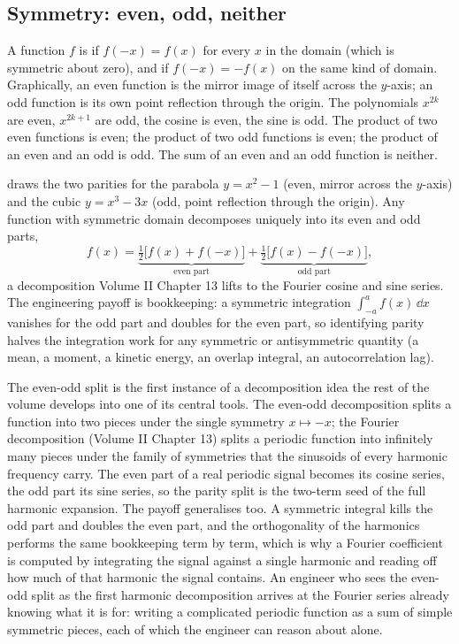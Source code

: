 \subsection{Symmetry: even, odd, neither}

A function $f$ is  if $f(-x) = f(x)$ for every $x$ in
the domain (which is symmetric about zero), and  if
$f(-x) = -f(x)$ on the same kind of domain. Graphically, an even
function is the mirror image of itself across the $y$-axis; an odd
function is its own point reflection through the origin. The
polynomials $x^{2k}$ are even, $x^{2k+1}$ are odd, the cosine is
even, the sine is odd. The product of two even functions is even;
the product of two odd functions is even; the product of an even
and an odd is odd. The sum of an even and an odd function is
neither.



 draws the two parities for
the parabola $y = x^{2} - 1$ (even, mirror across the $y$-axis) and
the cubic $y = x^{3} - 3x$ (odd, point reflection through the
origin). Any function with symmetric domain decomposes uniquely
into its even and odd parts,
\[
  f(x) = \underbrace{\tfrac{1}{2}\bigl[f(x) + f(-x)\bigr]}_{
    \text{even part}}
    + \underbrace{\tfrac{1}{2}\bigl[f(x) - f(-x)\bigr]}_{
    \text{odd part}},
\]
a decomposition Volume II Chapter 13 lifts to the Fourier cosine
and sine series. The engineering payoff is bookkeeping: a symmetric
integration $\int_{-a}^{a} f(x)\,\dd x$ vanishes for the odd part
and doubles for the even part, so identifying parity halves the
integration work for any symmetric or antisymmetric quantity (a
mean, a moment, a kinetic energy, an overlap integral, an
autocorrelation lag).

\begin{mastery}
The even-odd split is the first instance of a decomposition idea the
rest of the volume develops into one of its central tools. The
even-odd decomposition splits a function into two pieces under the
single symmetry $x \mapsto -x$; the Fourier decomposition (Volume II
Chapter 13) splits a periodic function into infinitely many pieces
under the family of symmetries that the sinusoids of every harmonic
frequency carry. The even part of a real periodic signal becomes its
cosine series, the odd part its sine series, so the parity split is
the two-term seed of the full harmonic expansion. The payoff
generalises too. A symmetric integral kills the odd part and doubles
the even part, and the orthogonality of the harmonics performs the
same bookkeeping term by term, which is why a Fourier coefficient is
computed by integrating the signal against a single harmonic and
reading off how much of that harmonic the signal contains. An
engineer who sees the even-odd split as the first harmonic
decomposition arrives at the Fourier series already knowing what it
is for: writing a complicated periodic function as a sum of simple
symmetric pieces, each of which the engineer can reason about alone.
\end{mastery}

